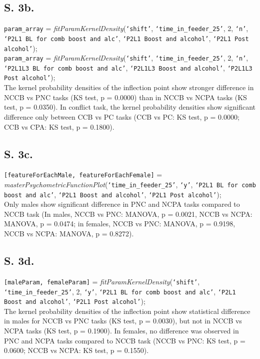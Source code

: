 \documentclass{article}
\begin{document}
\subsection{S. 3b.}
\texttt{param\_array} = \emph{fitParamKernelDensity}(\texttt{`shift'}, \texttt{`time\_in\_feeder\_25'}, 2, \texttt{`n'}, \texttt{`P2L1 BL for comb boost and alc'}, \texttt{`P2L1 Boost and alcohol'}, \texttt{`P2L1 Post alcohol'});\\
\texttt{param\_array} = \emph{fitParamKernelDensity}(\texttt{`shift'}, \texttt{`time\_in\_feeder\_25'}, 2, \texttt{`n'}, \texttt{`P2L1L3 BL for comb boost and alc'}, \texttt{`P2L1L3 Boost and alcohol'}, \texttt{`P2L1L3 Post alcohol'});\\

The kernel probability densities of the inflection point show stronger difference in NCCB vs PNC tasks (KS test, p = 0.0000) than in NCCB vs NCPA tasks (KS test, p = 0.0350). In conflict task, the kernel probability densities show significant difference only between CCB vs PC tasks (CCB vs PC: KS test, p = 0.0000; CCB vs CPA: KS test, p = 0.1800).

\subsection{S. 3c.}
\texttt{[featureForEachMale, featureForEachFemale]} = \emph{masterPsychometricFunctionPlot}(\texttt{`time\_in\_feeder\_25'}, \texttt{`y'}, \texttt{`P2L1 BL for comb boost and alc'}, \texttt{`P2L1 Boost and alcohol'}, \texttt{`P2L1 Post alcohol'});\\

Only males show significant difference in PNC and NCPA tasks compared to NCCB task (In males, NCCB vs PNC: MANOVA, p = 0.0021, NCCB vs NCPA: MANOVA, p = 0.0474; in females, NCCB vs PNC: MANOVA, p = 0.9198, NCCB vs NCPA: MANOVA, p = 0.8272).

\subsection{S. 3d.}
\texttt{[maleParam, femaleParam]} = \emph{fitParamKernelDensity}(\texttt{`shift'}, \texttt{`time\_in\_feeder\_25'}, 2, \texttt{`y'}, \texttt{`P2L1 BL for comb boost and alc'}, \texttt{`P2L1 Boost and alcohol'}, \texttt{`P2L1 Post alcohol'});\\

The kernel probability densities of the inflection point show statistical difference in males for NCCB vs PNC tasks (KS test, p = 0.0030), but not in NCCB vs NCPA tasks (KS test, p = 0.1900). In females, no difference was observed in PNC and NCPA tasks compared to NCCB task (NCCB vs PNC: KS test, p = 0.0600; NCCB vs NCPA: KS test, p = 0.1550).
\end{document}
